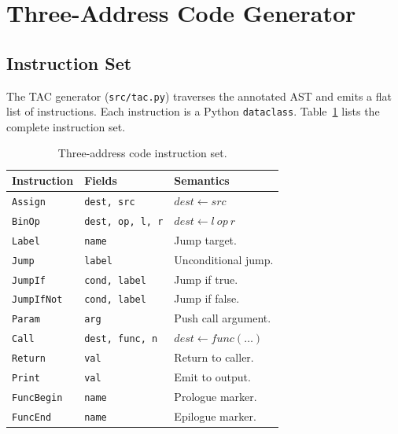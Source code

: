 \documentclass[12pt,a4paper]{report}
\begin{document}
\section{Three-Address Code Generator}

\subsection{Instruction Set}

The TAC generator (\texttt{src/tac.py}) traverses the annotated AST and emits
a flat list of instructions. Each instruction is a Python \texttt{dataclass}.
Table~\ref{tab:tac} lists the complete instruction set.

\begin{table}[H]
\centering
\caption{Three-address code instruction set.}
\label{tab:tac}
\small
\begin{tabular}{@{} l l p{4.2cm} @{}}
\toprule
\textbf{Instruction} & \textbf{Fields} & \textbf{Semantics} \\
\midrule
\texttt{Assign}    & \texttt{dest, src}         & $\mathit{dest} \leftarrow \mathit{src}$ \\
\texttt{BinOp}     & \texttt{dest, op, l, r}    & $\mathit{dest} \leftarrow l\ \mathit{op}\ r$ \\
\texttt{Label}     & \texttt{name}              & Jump target. \\
\texttt{Jump}      & \texttt{label}             & Unconditional jump. \\
\texttt{JumpIf}    & \texttt{cond, label}       & Jump if true. \\
\texttt{JumpIfNot} & \texttt{cond, label}       & Jump if false. \\
\texttt{Param}     & \texttt{arg}               & Push call argument. \\
\texttt{Call}      & \texttt{dest, func, n}     & $\mathit{dest} \leftarrow \mathit{func}(\ldots)$ \\
\texttt{Return}    & \texttt{val}               & Return to caller. \\
\texttt{Print}     & \texttt{val}               & Emit to output. \\
\texttt{FuncBegin} & \texttt{name}              & Prologue marker. \\
\texttt{FuncEnd}   & \texttt{name}              & Epilogue marker. \\
\bottomrule
\end{tabular}
\end{table}
\end{document}
